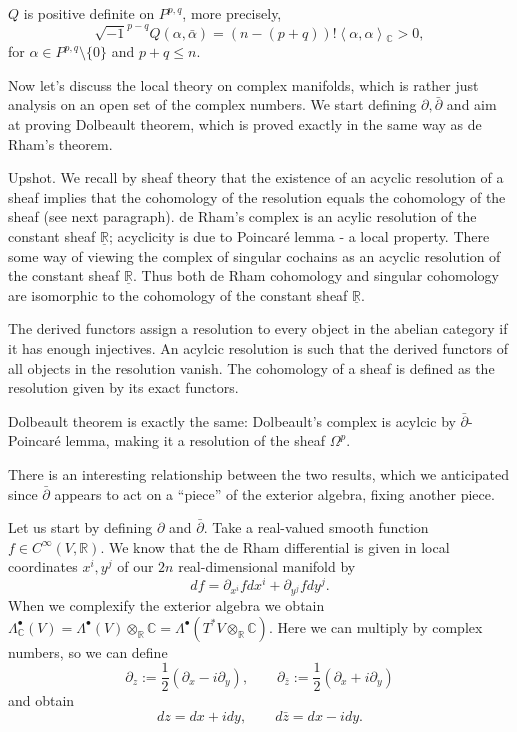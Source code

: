 \documentclass{book}
\begin{document}
\begin{theorem}
\label{theorem-hodge-riemann-relation}
$Q$ is positive definite on $P^{p,q}$, more
precisely,
$$
\sqrt{-1}^{p-q}Q(\alpha,\bar{\alpha})
=(n-(p+q))!\left\langle{}\alpha,
\alpha\right\rangle{}_{\mathbb{C}}>0,
$$
for $\alpha \in P^{p,q}\setminus\{0\}$ and
$p+q\leq n$.
\end{theorem}

\medskip\noindent
Now let's discuss the local theory on complex
manifolds,
which is rather just analysis on an open set
of the complex numbers.
We start defining $\partial,\bar\partial$
and aim at proving Dolbeault theorem,
which is proved exactly in the same way as de
Rham's theorem.

\medskip\noindent
Upshot. We recall by sheaf theory
that the existence of an acyclic resolution
of a sheaf
implies that the cohomology of the resolution
equals the cohomology of the sheaf (see next
paragraph).
de Rham's complex is an acylic resolution
of the constant sheaf
$\underline{\mathbb{R}}$;
acyclicity is due to Poincaré lemma - a local
property.
There some way of viewing the complex of
singular cochains
as an acyclic resolution of the constant
sheaf $\underline{\mathbb{R}}$.
Thus both de Rham cohomology and singular
cohomology
are isomorphic to the cohomology of the
constant sheaf $\underline{\mathbb{R}}$.

The derived functors assign a resolution to
every object
in the abelian category if it has enough
injectives.
An acylcic resolution is such that the
derived functors
of all objects in the resolution vanish.
The cohomology of a sheaf is defined
as the resolution given by its exact
functors.

Dolbeault theorem is exactly the same:
Dolbeault's complex is acylcic by
$\bar\partial$-Poincaré lemma,
making it a resolution of the sheaf
$\Omega^p$.

There is an interesting relationship between
the two results,
which we anticipated since $\bar\partial$
appears to act on a ``piece'' of the exterior
algebra,
fixing another piece.

\medskip\noindent
Let us start by defining $\partial$ and
$\bar\partial$.
Take a real-valued smooth function $f \in
C^\infty(V,\mathbb{R})$.
We know that the de Rham differential is
given
in local coordinates $x^i,y^j$ of our $2n$
real-dimensional manifold by
$$
df=\partial_{x^i}fdx^i + \partial_{y^j}fdy^j.
$$
When we complexify the exterior algebra we
obtain
$\Lambda_{\mathbb{C}}^\bullet(V)
= \Lambda^\bullet(V)
\otimes_\mathbb{R}\mathbb{C}
= \Lambda^\bullet(T^*V
\otimes_\mathbb{R}\mathbb{C})$.
Here we can multiply by complex numbers,
so we can define
$$
\partial_z:= \frac{1}{2}(\partial_x  - i
\partial_y ),\qquad
\partial_{\bar{z}}:=\frac{1}{2}(\partial_x +
i \partial_y)
$$
and obtain
$$
dz=dx+idy,\qquad  d\bar{z}=dx - i dy.
$$
\end{document}
